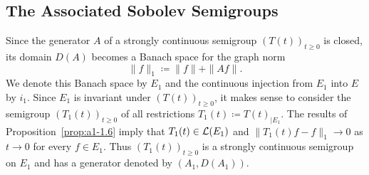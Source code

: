 \subsection{The Associated Sobolev Semigroups}\label{subsec:a1-3.6}%
Since the generator $A$ of a strongly continuous semigroup $(T(t))_{t\geq 0}$ is closed, its domain $D(A)$ becomes a Banach space for the graph norm
\[
    \|f\|_{1} \coloneq \|f\| + \|Af\| .
\]
We denote this Banach space by $E_{1}$ and the continuous injection from $E_{1}$ into $E$ by $i_{1}$.
Since $E_{1}$ is invariant under $(T(t))_{t\geq 0}$, it makes sense to consider the semigroup $(T_{1}(t))_{t\geq 0}$ of all restrictions $T_{1}(t) \coloneq T(t)_{\vert E_{1}}$.
The results of Proposition~\ref{prop:a1-1.6} imply that $T_{1}(t) \in \mathcal{L}(E_{1})$ and $\|T_{1}(t)f-f\|_{1} \to 0$ as $t \to 0$ for every $f \in E_{1}$.
Thus $(T_{1}(t))_{t\geq 0}$ is a strongly continuous semigroup on $E_{1}$ and has a generator denoted by $(A_{1},D(A_{1}))$.

